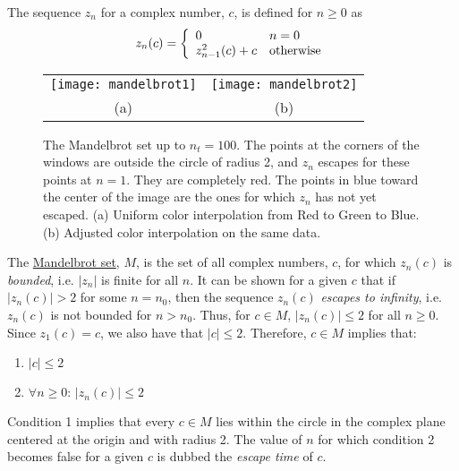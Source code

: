 \documentclass[addpoints]{exam}
\begin{document}
\begin{questions}

  The sequence $z_n$ for a complex number, $c$, is defined for $n\geq 0$ as
  \[
    z_n(c) = \left\{
      \begin{array}{l@{\quad}l}
        0 & n = 0\\
        z^2_{n-1}(c)+c & \textrm{otherwise}
      \end{array}
    \right.
  \]

  \begin{figure}
    \centering
    \begin{tabular}{cc}
      \texttt{[image: mandelbrot1]}& \texttt{[image: mandelbrot2]}\\
      (a) & (b)
    \end{tabular}
    \caption{The Mandelbrot set up to $n_t = 100$. The points at the corners of the windows are outside the circle of radius 2, and $z_n$ escapes for these points at $n=1$. They are completely red. The points in blue toward the center of the image are the ones for which $z_n$ has not yet escaped. (a) Uniform color interpolation from Red to Green to Blue. (b) Adjusted color interpolation on the same data.}
    \label{fig:mandelbrot}
  \end{figure}
  
  The \href{http://en.wikipedia.org/wiki/Mandelbrot_set}{Mandelbrot set}, $M$, is the set of all complex numbers, $c$, for which $z_n(c)$ is \textit{bounded}, i.e. $|z_n|$ is finite for all $n$. It can be shown for a given $c$ that if $|z_{n}(c)| > 2$ for some $n = n_0$, then the sequence $z_n(c)$ {\it escapes to infinity}, i.e. $z_n(c)$ is not bounded for $n > n_0$. Thus, for $c\in M$, $|z_n(c)| \leq 2$ for all $n\geq 0$. Since $z_1(c) = c$, we also have that $|c| \leq 2$. Therefore, $c\in M$ implies that:
  \begin{enumerate}
  \item $|c|\leq 2$
  \item $\forall n\geq 0:\, |z_n(c)|\leq 2$
  \end{enumerate}
  Condition 1 implies that every $c\in M$ lies within the circle in the complex plane centered at the origin and with radius 2. The value of $n$ for which condition 2 becomes false for a given $c$ is dubbed the {\it escape time} of $c$.


\end{questions}
\end{document}
